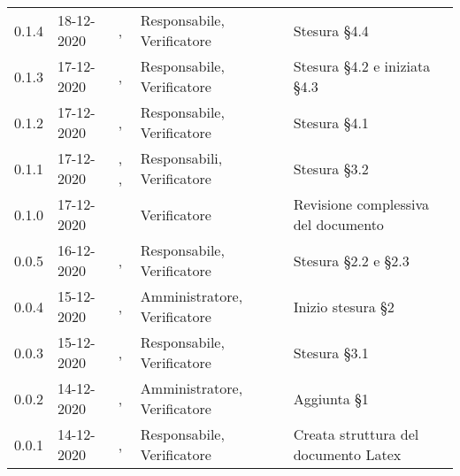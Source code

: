 {{\begin{longtable}{C{1.7cm} C{2.5cm} C{3.2cm} C{2.7cm} C{4.8cm}}
0.1.4 & 18-12-2020 & \SG{}, \ZM{} & Responsabile, Verificatore & Stesura \S 4.4 \\

0.1.3 & 17-12-2020 & \BM{}, \ZM{} & Responsabile, Verificatore & Stesura \S 4.2 e iniziata \S 4.3 \\

0.1.2 & 17-12-2020 & \SG{}, \ZM{} & Responsabile, Verificatore & Stesura \S 4.1 \\

0.1.1 & 17-12-2020 & \SG{}, \BM{}, \SH{} & Responsabili, Verificatore & Stesura \S 3.2 \\

0.1.0 & 17-12-2020 & \ZM{} & Verificatore & Revisione complessiva del documento \\

0.0.5 & 16-12-2020 & \BM{}, \SH{} & Responsabile, Verificatore & Stesura \S 2.2 e \S 2.3 \\
		
0.0.4 & 15-12-2020 & \PA{}, \SH{} & Amministratore, Verificatore & Inizio stesura \S 2 \\

0.0.3 & 15-12-2020 & \SG{}, \ZM{} & Responsabile, Verificatore & Stesura \S 3.1 \\

0.0.2 & 14-12-2020 & \PA{}, \ZM{} & Amministratore, Verificatore & Aggiunta \S 1 \\

0.0.1 & 14-12-2020 & \SG{}, \ZM{} & Responsabile, Verificatore & Creata struttura del documento Latex \\
		
\end{longtable}
}
}
